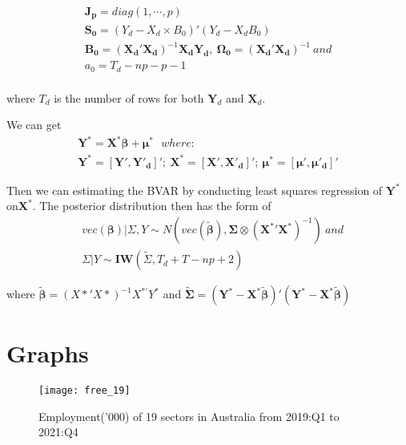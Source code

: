 \documentclass{monashthesis}
\begin{document}
\[
\begin{aligned}
\boldsymbol{J_p}=diag(1,\cdots,p)\\
\boldsymbol{S_0}=(Y_d-X_d\times B_0)'(Y_d-X_dB_0)\\
\boldsymbol{B_0}=(\boldsymbol{X_d}'\boldsymbol{X_d})^{-1}\boldsymbol{X_d}\boldsymbol{Y_d},\ \boldsymbol{\Omega_0}=(\boldsymbol{X_d}'\boldsymbol{X_d})^{-1}\  and\\
a_0=T_d-np-p-1\\
\end{aligned}
\]

where \(T_d\) is the number of rows for both \(\boldsymbol{Y}_d\) and \(\boldsymbol{X}_d\).

We can get
\[
\begin{aligned}
\boldsymbol{Y^*}=\boldsymbol{X^*}\boldsymbol{\beta}+\boldsymbol{\mu}^*\ \ \  where: \\
\boldsymbol{Y^*}=[\boldsymbol{Y'},\boldsymbol{Y'_d}]';\ \boldsymbol{X^*}=[\boldsymbol{X'},\boldsymbol{X'_d}]';\ \boldsymbol{\mu^*}=[\boldsymbol{\mu'},\boldsymbol{\mu'_d}]'
\end{aligned}
\]

Then we can estimating the BVAR by conducting least squares regression of \(\boldsymbol{Y}^*\) on\(\boldsymbol{X}^*\). The posterior distribution then has the form of
\[
\begin{aligned}
&vec(\mathbf{\beta})|\Sigma,Y\sim N(vec(\boldsymbol{\tilde\beta}),\boldsymbol{\Sigma}\otimes(\boldsymbol{X^*}'\boldsymbol{X^*})^{-1})\ and\\
&\Sigma|Y\sim\mathbf{IW}(\tilde\Sigma,T_d+T-np+2)
\end{aligned}
\]

where \(\boldsymbol{\tilde\beta} =(X*'X*)^{-1}X^{*'}Y^*\) and \(\tilde{\boldsymbol{\Sigma}}=(\boldsymbol{Y^*}-\boldsymbol{X^*}\boldsymbol{\tilde\beta})'(\boldsymbol{Y^*}-\boldsymbol{X^*}\boldsymbol{\tilde\beta})\)

\newpage

\hypertarget{graphs}{%
\chapter{Graphs}\label{graphs}}

\graphicspath{ {/Users/elvisyang/Desktop/hon_proj/Disaggregated_Employment/Honours_thesis/figures} }

\begin{figure}[t]
\texttt{[image: free\_19]}
\centering
\caption{Employment('000) of 19 sectors in Australia from 2019:Q1 to 2021:Q4}
\label{fig:19}
\end{figure}
\end{document}
